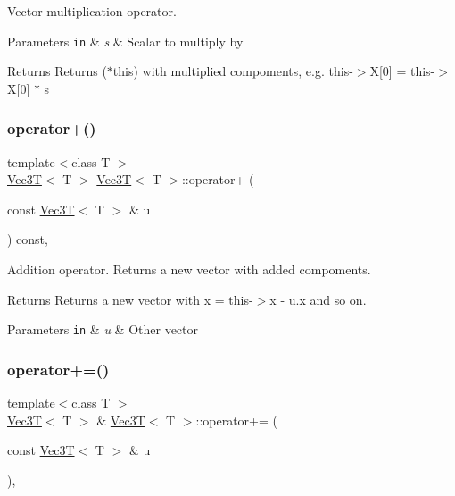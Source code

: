 Vector multiplication operator. 


\begin{DoxyParams}[1]{Parameters}
\mbox{\tt in}  & {\em s} & Scalar to multiply by \\
\hline
\end{DoxyParams}
\begin{DoxyReturn}{Returns}
Returns ($\ast$this) with multiplied compoments, e.\+g. this-\/$>$X\mbox{[}0\mbox{]} = this-\/$>$X\mbox{[}0\mbox{]} $\ast$ s 
\end{DoxyReturn}
\mbox{\label{classVec3T_af1ab895de89a1a3143f58d2ce5d78bc2}} 
\subsubsection{\texorpdfstring{operator+()}{operator+()}}
{\footnotesize\ttfamily template$<$class T $>$ \\
\hyperlink{classVec3T}{Vec3T}$<$ T $>$ \hyperlink{classVec3T}{Vec3T}$<$ T $>$\+::operator+ (\begin{DoxyParamCaption}\item[{const \hyperlink{classVec3T}{Vec3T}$<$ T $>$ \&}]{u }\end{DoxyParamCaption}) const\hspace{0.3cm}{\ttfamily [inline]}, {\ttfamily [noexcept]}}



Addition operator. Returns a new vector with added compoments. 

\begin{DoxyReturn}{Returns}
Returns a new vector with x = this-\/$>$x -\/ u.\+x and so on. 
\end{DoxyReturn}

\begin{DoxyParams}[1]{Parameters}
\mbox{\tt in}  & {\em u} & Other vector \\
\hline
\end{DoxyParams}
\mbox{\label{classVec3T_a7d06c56d8579d8b3695f43f62544f999}} 
\subsubsection{\texorpdfstring{operator+=()}{operator+=()}}
{\footnotesize\ttfamily template$<$class T $>$ \\
\hyperlink{classVec3T}{Vec3T}$<$ T $>$ \& \hyperlink{classVec3T}{Vec3T}$<$ T $>$\+::operator+= (\begin{DoxyParamCaption}\item[{const \hyperlink{classVec3T}{Vec3T}$<$ T $>$ \&}]{u }\end{DoxyParamCaption})\hspace{0.3cm}{\ttfamily [inline]}, {\ttfamily [noexcept]}}



